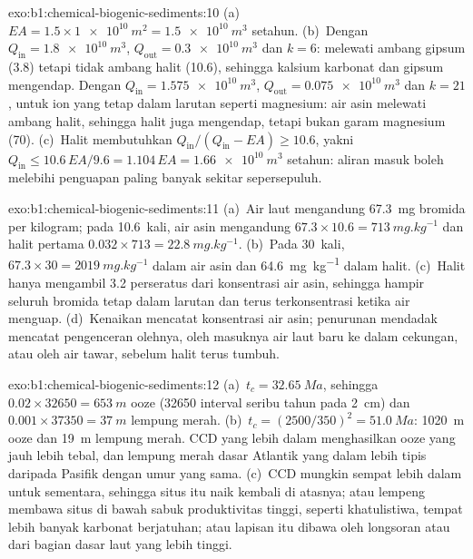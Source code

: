 \begin{solution}{exo:b1:chemical-biogenic-sediments:10}
(a)~$EA = 1.5\times\qty{1e10}{m^2} = \qty{1.5e10}{m^3}$ setahun. (b)~Dengan
$Q_{\mathrm{in}} = \qty{1.8e10}{m^3}$, $Q_{\mathrm{out}} = \qty{0.3e10}{m^3}$ dan
$k = 6$: melewati ambang gipsum (3.8) tetapi tidak ambang halit (10.6), sehingga kalsium
karbonat dan gipsum mengendap. Dengan $Q_{\mathrm{in}} =
\qty{1.575e10}{m^3}$, $Q_{\mathrm{out}} = \qty{0.075e10}{m^3}$ dan $k = 21$, untuk ion
yang tetap dalam larutan seperti magnesium: air asin melewati ambang halit, sehingga
halit juga mengendap, tetapi bukan garam magnesium (70). (c)~Halit membutuhkan
$Q_{\mathrm{in}}/(Q_{\mathrm{in}} - EA) \ge 10.6$, yakni $Q_{\mathrm{in}} \le 10.6\,EA/9.6 = 1.104\,EA = \qty{1.66e10}{m^3}$ setahun: aliran masuk boleh melebihi
penguapan paling banyak sekitar sepersepuluh.
\end{solution}

\begin{solution}{exo:b1:chemical-biogenic-sediments:11}
(a)~Air laut mengandung \qty{67.3}{mg} bromida per kilogram; pada 10.6~kali, air asin
mengandung $67.3\times10.6 = \qty{713}{mg.kg^{-1}}$ dan halit pertama
$0.032\times713 = \qty{22.8}{mg.kg^{-1}}$. (b)~Pada 30~kali, $67.3\times30 =
\qty{2019}{mg.kg^{-1}}$ dalam air asin dan \qty{64.6}{mg.kg^{-1}} dalam halit.
(c)~Halit hanya mengambil 3.2 perseratus dari konsentrasi air asin, sehingga hampir seluruh
bromida tetap dalam larutan dan terus terkonsentrasi ketika air menguap. (d)~Kenaikan
mencatat konsentrasi air asin; penurunan mendadak mencatat pengenceran olehnya, oleh
masuknya air laut baru ke dalam cekungan, atau oleh air tawar, sebelum halit terus tumbuh.
\end{solution}

\begin{solution}{exo:b1:chemical-biogenic-sediments:12}
(a)~$t_c = \qty{32.65}{Ma}$, sehingga $0.02\times\num{32650} = \qty{653}{m}$ ooze
(\num{32650} interval seribu tahun pada \qty{2}{cm}) dan
$0.001\times\num{37350} = \qty{37}{m}$ lempung merah. (b)~$t_c = (2500/350)^2 =
\qty{51.0}{Ma}$: \qty{1020}{m} ooze dan \qty{19}{m} lempung merah. CCD yang lebih
dalam menghasilkan ooze yang jauh lebih tebal, dan lempung merah dasar Atlantik yang
dalam lebih tipis daripada Pasifik dengan umur yang sama. (c)~CCD mungkin sempat lebih
dalam untuk sementara, sehingga situs itu naik kembali di atasnya; atau lempeng membawa
situs di bawah sabuk produktivitas tinggi, seperti khatulistiwa, tempat lebih banyak
karbonat berjatuhan; atau lapisan itu dibawa oleh longsoran atau  dari
bagian dasar laut yang lebih tinggi.
\end{solution}

